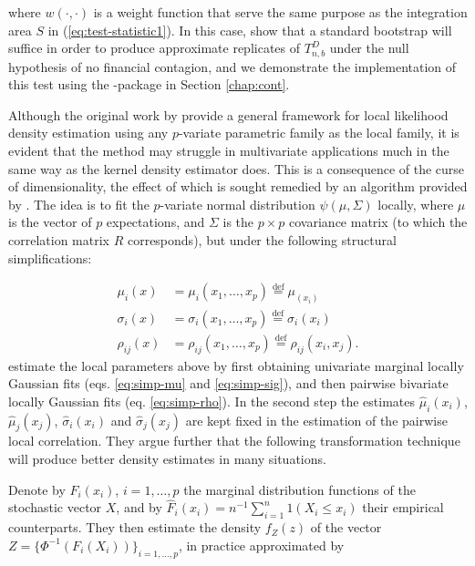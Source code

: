 where $w(\cdot, \cdot)$ is a weight function that serve the same purpose as the integration area $S$ in (\ref{eq:test-statistic1}). In this case, \citet{stov:tjos:huft:2014} show that a standard bootstrap will suffice in order to produce approximate replicates of $T_{n,b}^D$ under the null hypothesis of no financial contagion, and we demonstrate the implementation of this test using the -package in Section \ref{chap:cont}.

Although the original work by \citet{hjor:jone:1996} provide a general framework for local likelihood density estimation using any $p$-variate parametric family as the local family, it is evident that the method may struggle in multivariate applications much in the same way as the kernel density estimator does. This is a consequence of the curse of dimensionality, the effect of which is sought remedied by an algorithm provided by \citet{otne:tjos:2017}. The idea is to fit the $p$-variate normal distribution $\psi(\mu, \Sigma)$ locally, where $\mu$ is the vector of $p$ expectations, and $\Sigma$ is the $p\times p$ covariance matrix (to which the correlation matrix $R$ corresponds), but under the following structural simplifications:

\begin{align}
\mu_i(x) &= \mu_i(x_1, \ldots, x_p) \stackrel{\textrm{def}}{=} \mu_(x_i) \label{eq:simp-mu}\\
\sigma_i(x) &= \sigma_i(x_1, \ldots, x_p)  \stackrel{\textrm{def}}{=} \sigma_i(x_i) \label{eq:simp-sig} \\
\rho_{ij}(x) &= \rho_{ij}(x_1, \ldots, x_p) \stackrel{\textrm{def}}{=} \rho_{ij}(x_i, x_j). \label{eq:simp-rho}
\end{align}
\citet{otne:tjos:2017} estimate the local parameters above by first obtaining univariate marginal locally Gaussian fits (eqs. \ref{eq:simp-mu} and \ref{eq:simp-sig}), and then pairwise bivariate locally Gaussian fits (eq. \ref{eq:simp-rho}). In the second step the estimates $\widehat\mu_i(x_i)$, $\widehat\mu_j(x_j)$, $\widehat\sigma_i(x_i)$ and $\widehat\sigma_j(x_j)$ are kept fixed in the estimation of the pairwise local correlation. They argue further that the following transformation technique will produce better density estimates in many situations. 

Denote by $F_i(x_i)$, $i = 1,\ldots, p$ the marginal distribution functions of the stochastic vector $X$, and by $\widehat F_i(x_i) = n^{-1}\sum_{i=1}^n 1(X_i \leq x_i)$ their empirical counterparts. They then estimate the density $f_Z(z)$ of the vector $Z = \{\Phi^{-1}(F_i(X_i))\}_{i=1,\ldots,p}$, in practice approximated by 

